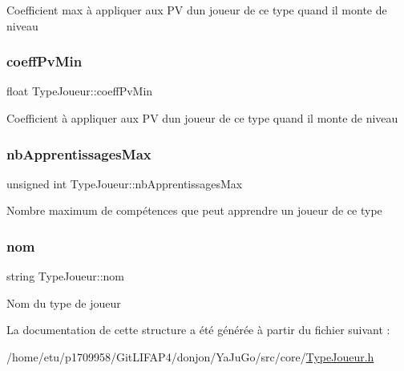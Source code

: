 Coefficient max à appliquer aux PV d\textquotesingle{}un joueur de ce type quand il monte de niveau \mbox{\label{structTypeJoueur_abdaca872c129dc3d31a9e2aa23d994f6}} 
\subsubsection{\texorpdfstring{coeff\+Pv\+Min}{coeffPvMin}}
{\footnotesize\ttfamily float Type\+Joueur\+::coeff\+Pv\+Min}

Coefficient à appliquer aux PV d\textquotesingle{}un joueur de ce type quand il monte de niveau \mbox{\label{structTypeJoueur_ac57617d27d138c78f338f78a359a77dd}} 
\subsubsection{\texorpdfstring{nb\+Apprentissages\+Max}{nbApprentissagesMax}}
{\footnotesize\ttfamily unsigned int Type\+Joueur\+::nb\+Apprentissages\+Max}

Nombre maximum de compétences que peut apprendre un joueur de ce type \mbox{\label{structTypeJoueur_a66919412973844922efebb6b0a0a95b8}} 
\subsubsection{\texorpdfstring{nom}{nom}}
{\footnotesize\ttfamily string Type\+Joueur\+::nom}

Nom du type de joueur 

La documentation de cette structure a été générée à partir du fichier suivant \+:\begin{DoxyCompactItemize}
\item 
/home/etu/p1709958/\+Git\+L\+I\+F\+A\+P4/donjon/\+Ya\+Ju\+Go/src/core/\mbox{\hyperlink{TypeJoueur_8h}{Type\+Joueur.\+h}}\end{DoxyCompactItemize}
